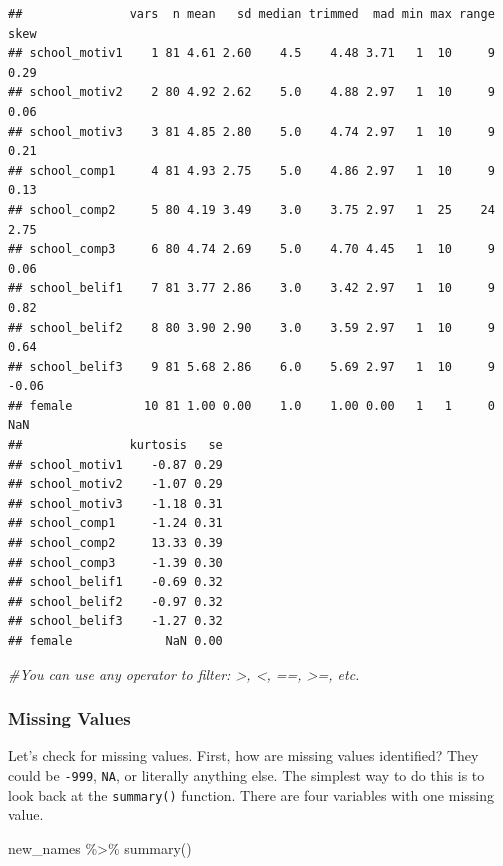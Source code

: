 \documentclass[
]{article}
\newenvironment{Shaded}{\begin{snugshade}}{\end{snugshade}}
\newcommand{\CommentTok}[1]{\textcolor[rgb]{0.56,0.35,0.01}{\textit{#1}}}
\newcommand{\FunctionTok}[1]{\textcolor[rgb]{0.00,0.00,0.00}{#1}}
\newcommand{\NormalTok}[1]{#1}
\newcommand{\SpecialCharTok}[1]{\textcolor[rgb]{0.00,0.00,0.00}{#1}}
\begin{document}
\begin{verbatim}
##               vars  n mean   sd median trimmed  mad min max range  skew
## school_motiv1    1 81 4.61 2.60    4.5    4.48 3.71   1  10     9  0.29
## school_motiv2    2 80 4.92 2.62    5.0    4.88 2.97   1  10     9  0.06
## school_motiv3    3 81 4.85 2.80    5.0    4.74 2.97   1  10     9  0.21
## school_comp1     4 81 4.93 2.75    5.0    4.86 2.97   1  10     9  0.13
## school_comp2     5 80 4.19 3.49    3.0    3.75 2.97   1  25    24  2.75
## school_comp3     6 80 4.74 2.69    5.0    4.70 4.45   1  10     9  0.06
## school_belif1    7 81 3.77 2.86    3.0    3.42 2.97   1  10     9  0.82
## school_belif2    8 80 3.90 2.90    3.0    3.59 2.97   1  10     9  0.64
## school_belif3    9 81 5.68 2.86    6.0    5.69 2.97   1  10     9 -0.06
## female          10 81 1.00 0.00    1.0    1.00 0.00   1   1     0   NaN
##               kurtosis   se
## school_motiv1    -0.87 0.29
## school_motiv2    -1.07 0.29
## school_motiv3    -1.18 0.31
## school_comp1     -1.24 0.31
## school_comp2     13.33 0.39
## school_comp3     -1.39 0.30
## school_belif1    -0.69 0.32
## school_belif2    -0.97 0.32
## school_belif3    -1.27 0.32
## female             NaN 0.00
\end{verbatim}

\begin{Shaded}
\begin{Highlighting}[]
\CommentTok{\#You can use any operator to filter: \textgreater{}, \textless{}, ==, \textgreater{}=, etc.}
\end{Highlighting}
\end{Shaded}

\hypertarget{missing-values}{%
\subsubsection{Missing Values}\label{missing-values}}

Let's check for missing values. First, how are missing values
identified? They could be \texttt{-999}, \texttt{NA}, or literally
anything else. The simplest way to do this is to look back at the
\texttt{summary()} function. There are four variables with one missing
value.

\begin{Shaded}
\begin{Highlighting}[]
\NormalTok{new\_names }\SpecialCharTok{\%\textgreater{}\%} 
  \FunctionTok{summary}\NormalTok{() }
\end{Highlighting}
\end{Shaded}
\end{document}
